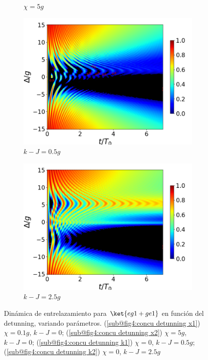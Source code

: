 \begin{figure}[h]
\begin{subfigure}{0.49\textwidth}
        \caption{$\chi=5g$}
        \label{fig4:concu detunning 1 x2}
    \end{subfigure}
    \vfill
    \begin{subfigure}{0.49\textwidth}
        \includegraphics[width=\textwidth]{figuras/ch4/concu/delta/eg1+ge1 k=0.5g x=0.0g J=0.0g gamma=0.25g concu delta dis.png}
        \caption{$k-J=0.5g$}
        \label{fig4:concu detunning 1 k1}
    \end{subfigure}
    \hfill
    \begin{subfigure}{0.49\textwidth}
        \includegraphics[width=\textwidth]{figuras/ch4/concu/delta/eg1+ge1 k=2.5g x=0.0g J=0.0g gamma=0.25g concu delta dis.png}
        \caption{$k-J=2.5g$}
        \label{fig4:concu detunning 1 k2}
    \end{subfigure}
    \caption{Dinámica de entrelazamiento para $\ket{eg1+ge1}$ en función del detunning, variando parámetros. (\ref{sub@fig4:concu detunning x1}) $\chi=0.1g$, $k-J=0$; (\ref{sub@fig4:concu detunning x2}) $\chi=5g$, $k-J=0$; (\ref{sub@fig4:concu detunning k1}) $\chi=0$, $k-J=0.5g$; (\ref{sub@fig4:concu detunning k2}) $\chi=0$, $k-J=2.5g$ }
    \label{fig4:concu detunning 1 params}
\end{figure}
